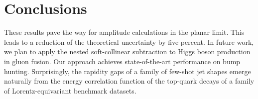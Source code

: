 \section{Conclusions}\label{sec:conclusions}

These results pave the way for amplitude calculations in the planar
limit. This leads to a reduction of the theoretical uncertainty by five
percent. In future work, we plan to apply the nested soft-collinear
subtraction to Higgs boson production in gluon fusion. Our approach
achieves state-of-the-art performance on bump hunting. Surprisingly, the
rapidity gaps of a family of few-shot jet shapes emerge naturally from
the energy correlation function of the top-quark decays of a family of
Lorentz-equivariant benchmark datasets.

